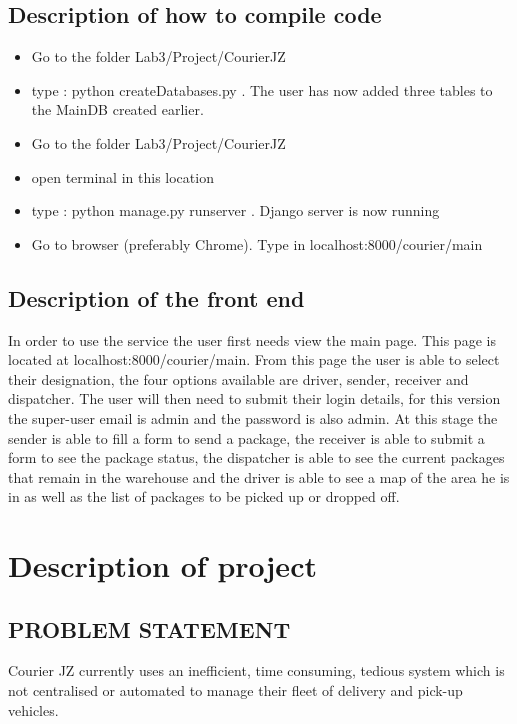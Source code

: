 \documentclass[paper=a4, fontsize=11pt]{scrartcl} %
\numberwithin{equation}{section} %
\numberwithin{figure}{section} %
\numberwithin{table}{section} %
\begin{document}
\subsection{Description of how to compile code}
\begin{itemize}
\item Go to the folder Lab3/Project/CourierJZ
\item type : python createDatabases.py . The user has now added three tables to the MainDB created earlier.
\item Go to the folder Lab3/Project/CourierJZ
\item open terminal in this location
\item type : python manage.py runserver . Django server is now running
\item Go to browser (preferably Chrome). Type in localhost:8000/courier/main

 

\end{itemize}

\subsection{Description of the front end}
In order to use the service the user first needs view the main page. This page is located at localhost:8000/courier/main. From this page the user is able to select their designation, the four options available are driver, sender, receiver and dispatcher. The user will then need to submit their login details, for this version the super-user email is admin and the password is also admin. At this stage the sender is able to fill a form to send a package, the receiver is able to submit a form to see the package status, the dispatcher is able to see the current packages that remain in the warehouse and the driver is able to see a map of the area he is in as well as the list of packages to be picked up or dropped off.

\section{Description of project}

\subsection{PROBLEM STATEMENT}

Courier JZ currently uses an inefficient, time consuming, tedious system which is not centralised or automated to manage their fleet of delivery and pick-up vehicles.
\end{document}
